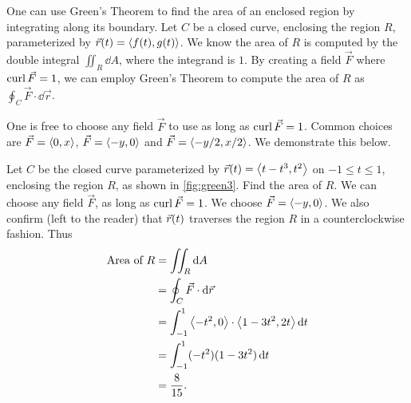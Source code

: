 One can use Green's Theorem to find the area of an enclosed region by integrating along its boundary. Let $C$ be a closed curve, enclosing the region $R$, parameterized by $\vec r(t) =\left\langle f(t),g(t)\right\rangle$. We know the area of $R$ is computed by the double integral $\iint_R \dd A$, where the integrand is $1$. By creating a field $\vec F$ where $\operatorname{curl} \vec F =1$, we can employ Green's Theorem to compute the area of $R$ as $\oint_C \vec F\cdot\dd\vec r$. 

One is free to choose any field $\vec F$ to use as long as $\operatorname{curl}\vec F = 1$. Common choices are $\vec F =\left\langle 0,x\right\rangle$, $\vec F =\left\langle -y,0\right\rangle$ and $\vec F =\left\langle -y/2,x/2\right\rangle$. We demonstrate this below.


\begin{example}\label{ex_green3}%
Let $C$ be the closed curve parameterized by $\vec r(t) =\left\langle t-t^3,t^2\right\rangle$ on $-1\leq t\leq 1$, enclosing the region $R$, as shown in \autoref{fig:green3}. Find the area of $R$.%
\solution
We can choose any field $\vec F$, as long as $\operatorname{curl} \vec F = 1$. We choose $\vec F =\left\langle -y,0\right\rangle$. We also confirm (left to the reader) that $\vec r(t)$ traverses the region $R$ in a counterclockwise fashion. Thus
\begin{align*}
	\text{Area of $R$}
	&= \iint_R\operatorname{d}\! A \\
	&= \oint_C \vec F\cdot\operatorname{d}\!\vec r\\
	&= \int_{-1}^1\left\langle -t^2,0\right\rangle\cdot\left\langle 1-3t^2,2t\right\rangle\operatorname{d}\! t\\
	&= \int_{-1}^1 (-t^2)(1-3t^2)\operatorname{d}\! t \\
	&= \frac8{15}.
\end{align*}
\end{example}

